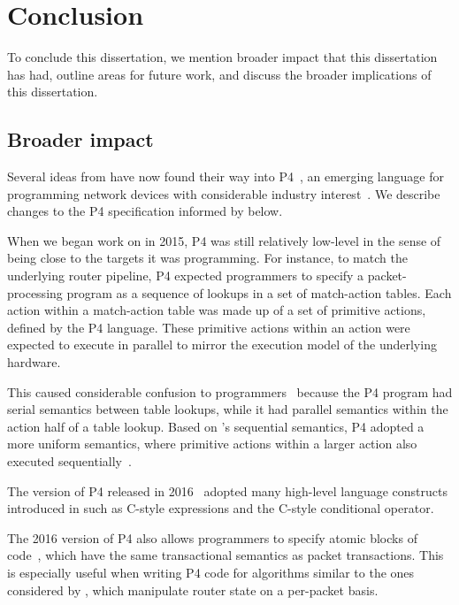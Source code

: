 \chapter{Conclusion}
\label{chap:concl}


To conclude this dissertation, we mention broader impact that this dissertation
has had, outline areas for future work, and discuss the broader implications of
this dissertation.

\section{Broader impact}
\label{s:impact}
Several ideas from \pktlanguage have now found their way into P4~\cite{p4}, an
emerging language for programming network devices with considerable industry
interest~\cite{p4org}. We describe changes to the P4 specification informed by
\pktlanguage below.
\begin{CompactEnumerate}
\item When we began work on \pktlanguage in 2015, P4 was still relatively
low-level in the sense of being close to the targets it was programming. For
instance, to match the underlying router pipeline, P4 expected programmers to
specify a packet-processing program as a sequence of lookups in a set of
match-action tables. Each action within a match-action table was made up of a
set of primitive actions, defined by the P4 language. These primitive actions
within an action were expected to execute in parallel to mirror the execution
model of the underlying hardware.

This caused considerable confusion to programmers~\cite{p4-semantics} because
the P4 program had serial semantics between table lookups, while it had
parallel semantics within the action half of a table lookup. Based on
\pktlanguage's sequential semantics, P4 adopted a more uniform semantics, where
primitive actions within a larger action also executed
sequentially~\cite{p4_sequential_pr, p4_sequential_issue}.

\item The version of P4 released in 2016~\cite{p4_16} adopted many
high-level language constructs introduced in \pktlanguage such as C-style
expressions and the C-style conditional operator.

\item The 2016 version of P4 also allows programmers to specify atomic blocks of
code~\cite{p4_atomic_pr, p4_atomic_issue}, which have the same transactional
semantics as packet transactions. This is especially useful when writing P4
code for algorithms similar to the ones considered by \pktlanguage, which
manipulate router state on a per-packet basis.
\end{CompactEnumerate}

